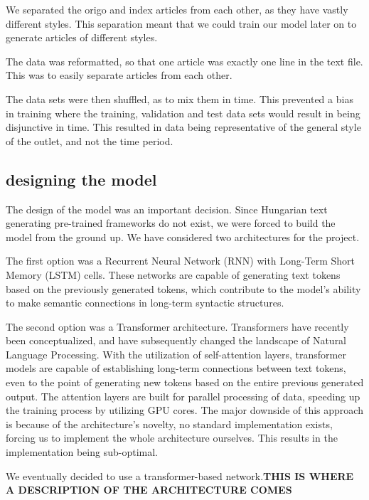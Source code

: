 \documentclass[journal]{IEEEtai}
\begin{document}
We separated the origo and index articles from each other, as they have vastly different styles. This separation meant that we could train our model later on to generate articles of different styles. 

The data was reformatted, so that one article was exactly one line in the text file. This was to easily separate articles from each other.

The data sets were then shuffled, as to mix them in time. This prevented a bias in training where the training, validation and test data sets would result in being disjunctive in time. This resulted in data being representative of the general style of the outlet, and not the time period. 

\subsection{designing the model}
The design of the model was an important decision. Since Hungarian text generating pre-trained frameworks do not exist, we were forced to build the model from the ground up. We have considered two architectures for the project. 

The first option was a Recurrent Neural Network (RNN) with Long-Term Short Memory\cite{lstm} (LSTM) cells. These networks are capable of generating text tokens based on the previously generated tokens, which contribute to the model's ability to make semantic connections in long-term syntactic structures.

The second option was a Transformer\cite{vaswani2017attention} architecture. Transformers have recently been conceptualized, and have subsequently changed the landscape of Natural Language Processing. With the utilization of self-attention layers, transformer models are capable of establishing long-term connections between text tokens, even to the point of generating new tokens based on the entire previous generated output. The attention layers are built for parallel processing of data, speeding up the training process by utilizing GPU cores. The major downside of this approach is because of the architecture's novelty, no standard implementation exists, forcing us to implement the whole architecture ourselves. This results in the implementation being sub-optimal.

We eventually decided to use a transformer-based network.\textbf{THIS IS WHERE A DESCRIPTION OF THE ARCHITECTURE COMES} 
\end{document}
